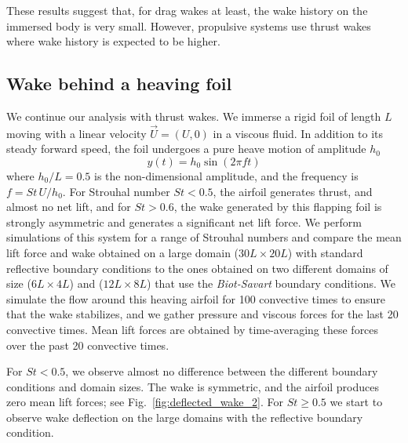 \documentclass[preprint,12pt]{elsarticle}
\begin{document}
These results suggest that, for drag wakes at least, the wake history on the immersed body is very small. However, propulsive systems use thrust wakes where wake history is expected to be higher.

\subsection{Wake behind a heaving foil}

We continue our analysis with thrust wakes. We immerse a rigid foil of length $L$ moving with a linear velocity $\vec{U}=(U,0)$ in a viscous fluid. In addition to its steady forward speed, the foil undergoes a pure heave motion of amplitude $h_0$
\begin{equation}
    y(t) = h_0 \sin(2\pi f t)
\end{equation}
where $h_0/L=0.5$ is the non-dimensional amplitude, and the frequency is $f = St\,U/h_0$. For Strouhal number $St<0.5$, the airfoil generates thrust, and almost no net lift, and for $St>0.6$, the wake generated by this flapping foil is strongly asymmetric and generates a significant net lift force. We perform simulations of this system for a range of Strouhal numbers and compare the mean lift force and wake obtained on a large domain ($30L\times20L$) with standard reflective boundary conditions to the ones obtained on two different domains of size ($6L\times4L$) and ($12L\times8L$) that use the \emph{Biot-Savart} boundary conditions. We simulate the flow around this heaving airfoil for 100 convective times to ensure that the wake stabilizes, and we gather pressure and viscous forces for the last 20 convective times. Mean lift forces are obtained by time-averaging these forces over the past 20 convective times.

For $St<0.5$, we observe almost no difference between the different boundary conditions and domain sizes. The wake is symmetric, and the airfoil produces zero mean lift forces; see Fig.~\ref{fig:deflected_wake_2}. For $St\ge 0.5$ we start to observe wake deflection on the large domains with the reflective boundary condition.
\end{document}
